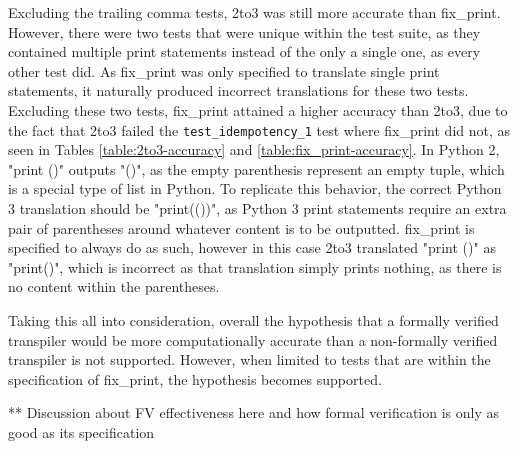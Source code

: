 Excluding the trailing comma tests, 2to3 was still more accurate than fix\_print. However, there were two tests that were unique within the test suite, as they contained multiple print statements instead of the only a single one, as every other test did. As fix\_print was only specified to translate single print statements, it naturally produced incorrect translations for these two tests. Excluding these two tests, fix\_print attained a higher accuracy than 2to3, due to the fact that 2to3 failed the \verb|test_idempotency_1| test where fix\_print did not, as seen in Tables \ref{table:2to3-accuracy} and \ref{table:fix_print-accuracy}. In Python 2, "print ()" outputs "()", as the empty parenthesis represent an empty tuple, which is a special type of list in Python. To replicate this behavior, the correct Python 3 translation should be "print(())", as Python 3 print statements require an extra pair of parentheses around whatever content is to be outputted. fix\_print is specified to always do as such, however in this case 2to3 translated "print ()" as "print()", which is incorrect as that translation simply prints nothing, as there is no content within the parentheses.

Taking this all into consideration, overall the hypothesis that a formally verified transpiler would be more computationally accurate than a non-formally verified transpiler is not supported. However, when limited to tests that are within the specification of fix\_print, the hypothesis becomes supported.

** Discussion about FV effectiveness here and how formal verification is only as good as its specification

